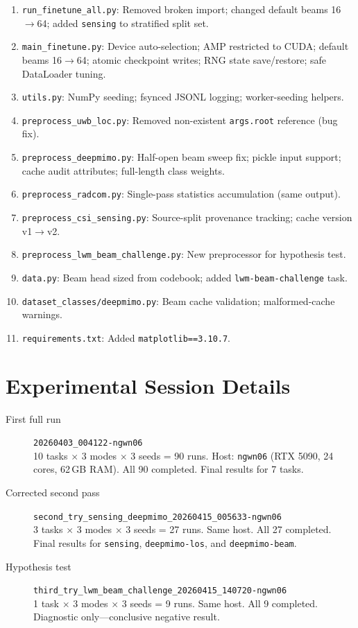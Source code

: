 \documentclass[11pt]{article}
\newcommand{\code}[1]{\texttt{#1}}
\begin{document}
\begin{enumerate}
    \item \code{run\_finetune\_all.py}: Removed broken import; changed default beams 16$\to$64; added \code{sensing} to stratified split set.
    \item \code{main\_finetune.py}: Device auto-selection; AMP restricted to CUDA; default beams 16$\to$64; atomic checkpoint writes; RNG state save/restore; safe DataLoader tuning.
    \item \code{utils.py}: NumPy seeding; fsynced JSONL logging; worker-seeding helpers.
    \item \code{preprocess\_uwb\_loc.py}: Removed non-existent \code{args.root} reference (bug fix).
    \item \code{preprocess\_deepmimo.py}: Half-open beam sweep fix; pickle input support; cache audit attributes; full-length class weights.
    \item \code{preprocess\_radcom.py}: Single-pass statistics accumulation (same output).
    \item \code{preprocess\_csi\_sensing.py}: Source-split provenance tracking; cache version v1$\to$v2.
    \item \code{preprocess\_lwm\_beam\_challenge.py}: New preprocessor for hypothesis test.
    \item \code{data.py}: Beam head sized from codebook; added \code{lwm-beam-challenge} task.
    \item \code{dataset\_classes/deepmimo.py}: Beam cache validation; malformed-cache warnings.
    \item \code{requirements.txt}: Added \code{matplotlib==3.10.7}.
\end{enumerate}

\section{Experimental Session Details}
\label{app:sessions}

\begin{description}
    \item[First full run] \code{20260403\_004122-ngwn06}\\
    10 tasks $\times$ 3 modes $\times$ 3 seeds = 90 runs. Host: \code{ngwn06} (RTX 5090, 24 cores, 62\,GB RAM). All 90 completed. Final results for 7 tasks.

    \item[Corrected second pass] \code{second\_try\_sensing\_deepmimo\_20260415\_005633-ngwn06}\\
    3 tasks $\times$ 3 modes $\times$ 3 seeds = 27 runs. Same host. All 27 completed. Final results for \code{sensing}, \code{deepmimo-los}, and \code{deepmimo-beam}.

    \item[Hypothesis test] \code{third\_try\_lwm\_beam\_challenge\_20260415\_140720-ngwn06}\\
    1 task $\times$ 3 modes $\times$ 3 seeds = 9 runs. Same host. All 9 completed. Diagnostic only---conclusive negative result.
\end{description}
\end{document}
